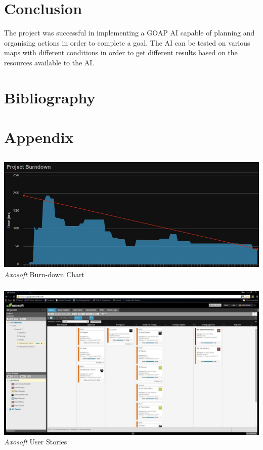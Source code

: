 \documentclass[a4paper]{report}
\begin{document}
\chapter{Conclusion}
The project was successful in implementing a GOAP AI capable of planning and organising actions in order to complete a goal. The AI can be tested on various maps with different conditions in order to get different results based on the resources available to the AI. 
\chapter{Bibliography}
\appendix
\chapter{Appendix}
\section{}
\subsection{}
	\includegraphics[width=1.0\linewidth]{./appendixImages/AxosoftScreenShot01}
	\textit{Axosoft} Burn-down Chart 
\subsection{}
	\includegraphics[width=1.0\linewidth]{./appendixImages/AxosoftScreenShot02}
	\textit{Axosoft} User Stories
\pagebreak
\end{document}
